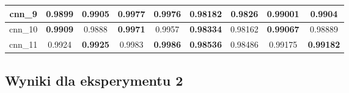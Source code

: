 \begin{table}[p]
\begin{tabular} {|c|c|c|c|c|c|c|c|c| }
        cnn\_9   & 0.9899                              & \textbf{0.9905}                     & \textbf{0.9977}             & 0.9976                              & 0.98182                     & \textbf{0.9826}                      & 0.99001                              & \textbf{0.9904}             \\ \hline
        cnn\_10  & \textbf{0.9909}                     & 0.9888                              & \textbf{0.9971}             & 0.9957                              & \textbf{0.98334}            & 0.98162                              & \textbf{0.99067}                     & 0.98889                     \\ \hline
        cnn\_11  & 0.9924                              & \textbf{0.9925}                     & 0.9983                      & \textbf{0.9986}                     & \textbf{0.98536}            & 0.98486                              & 0.99175                              & \textbf{0.99182}            \\ \hline
    \end{tabular}
\end{table}


\newpage %
\subsection{\label{wyniki_eksperymentow_eks_2}Wyniki dla eksperymentu 2}




